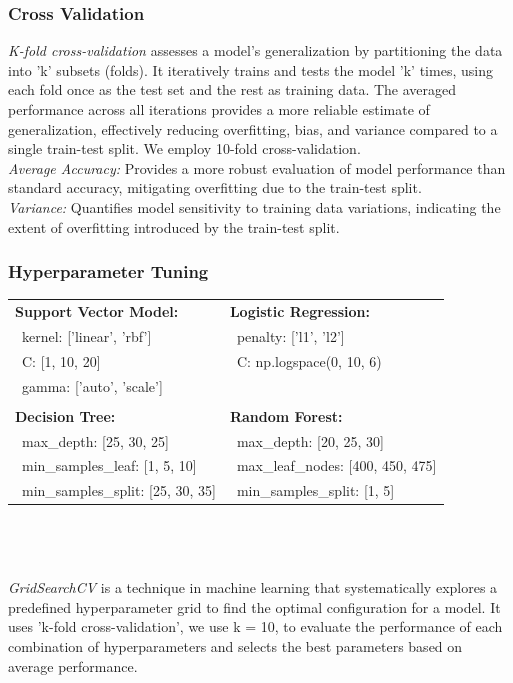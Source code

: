 \subsubsection{Cross Validation}
\textit{K-fold cross-validation} assesses a model's generalization by partitioning the data into 'k' subsets (folds). It iteratively trains and tests the model 'k' times, using each fold once as the test set and the rest as training data. The averaged performance across all iterations provides a more reliable estimate of generalization, effectively reducing overfitting, bias, and variance compared to a single train-test split. We employ 10-fold cross-validation.\\
\textit{Average Accuracy:} Provides a more robust evaluation of model performance than standard accuracy, mitigating overfitting due to the train-test split.\\
\textit{Variance:} Quantifies model sensitivity to training data variations, indicating the extent of overfitting introduced by the train-test split.
\subsubsection{Hyperparameter Tuning}
\begin{tabular}{ll}
\textbf{Support Vector Model:} & \textbf{Logistic Regression:} \\
\ kernel: ['linear', 'rbf'] & \ penalty: ['l1', 'l2'] \\
\ C: [1, 10, 20] & \ C: np.logspace(0, 10, 6) \\
\ gamma: ['auto', 'scale'] & \\
& \\
\textbf{Decision Tree:} & \textbf{Random Forest:} \\
\ max\_depth: [25, 30, 25] & \ max\_depth: [20, 25, 30] \\
\ min\_samples\_leaf: [1, 5, 10] & \ max\_leaf\_nodes: [400, 450, 475] \\
\ min\_samples\_split: [25, 30, 35] & \ min\_samples\_split: [1, 5] \\
\end{tabular}\\\\\\
\textit{GridSearchCV} is a technique in machine learning that systematically explores a predefined hyperparameter grid to find the optimal configuration for a model. It uses 'k-fold cross-validation', we use k = 10, to evaluate the performance of each combination of hyperparameters and selects the best parameters based on average performance.
